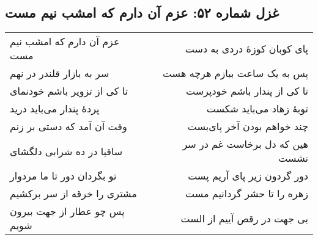 \begin{center}
\section*{غزل شماره ۵۲: عزم آن دارم که امشب نیم مست}
\label{sec:052}
\begin{longtable}{l p{0.5cm} r}
عزم آن دارم که امشب نیم مست
&&
پای کوبان کوزهٔ دردی به دست
\\
سر به بازار قلندر در نهم
&&
پس به یک ساعت ببازم هرچه هست
\\
تا کی از تزویر باشم خودنمای
&&
تا کی از پندار باشم خودپرست
\\
پردهٔ پندار می‌باید درید
&&
توبهٔ زهاد می‌باید شکست
\\
وقت آن آمد که دستی بر زنم
&&
چند خواهم بودن آخر پای‌بست
\\
ساقیا در ده شرابی دلگشای
&&
هین که دل برخاست غم در سر نشست
\\
تو بگردان دور تا ما مردوار
&&
دور گردون زیر پای آریم پست
\\
مشتری را خرقه از سر برکشیم
&&
زهره را تا حشر گردانیم مست
\\
پس چو عطار از جهت بیرون شویم
&&
بی جهت در رقص آییم از الست
\\
\end{longtable}
\end{center}
